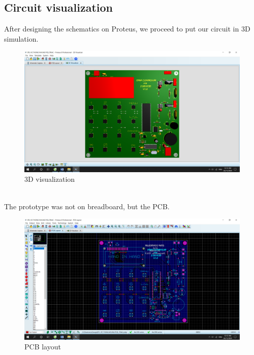\documentclass[a4paper]{article}
\begin{document}
\subsection{Circuit visualization}
After designing the schematics on Proteus, we proceed to put our circuit in 3D simulation.
\begin{figure}[h!]
\centering
\includegraphics[width=17cm]{images/3d.PNG}
\caption*{3D visualization}
\end{figure}\\
The prototype was not on breadboard, but the PCB.
\begin{figure}[h!]
\centering
\includegraphics[width=17cm]{images/PCB.PNG}
\caption*{PCB layout}
\end{figure}
\end{document}
